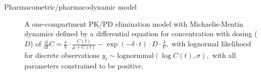 \documentclass[letterpaper,11pt]{article}
\theoremstyle{plain}%
\theoremstyle{remark}
\begin{document}
\begin{description}
\item[Pharmacometric/pharmacodynamic model]

A one-compartment PK/PD elimination model with Michaelis-Mentin dynamics defined by a differential equation for concentration with dosing ($D$) of 
$\frac{\textrm{d}}{\textrm{d}t} C
= \frac{\nu}{V} \cdot \frac{C(t)}{\mu + C(t)}
- \exp(-\delta \cdot t) \cdot D \cdot \frac{\delta}{V},$ with lognormal likelihood for discrete observations
$y_t \sim \textrm{lognormmal}(\log C(t), \sigma),$ with all parameters constrained to be positive.


\end{description}
\end{document}
